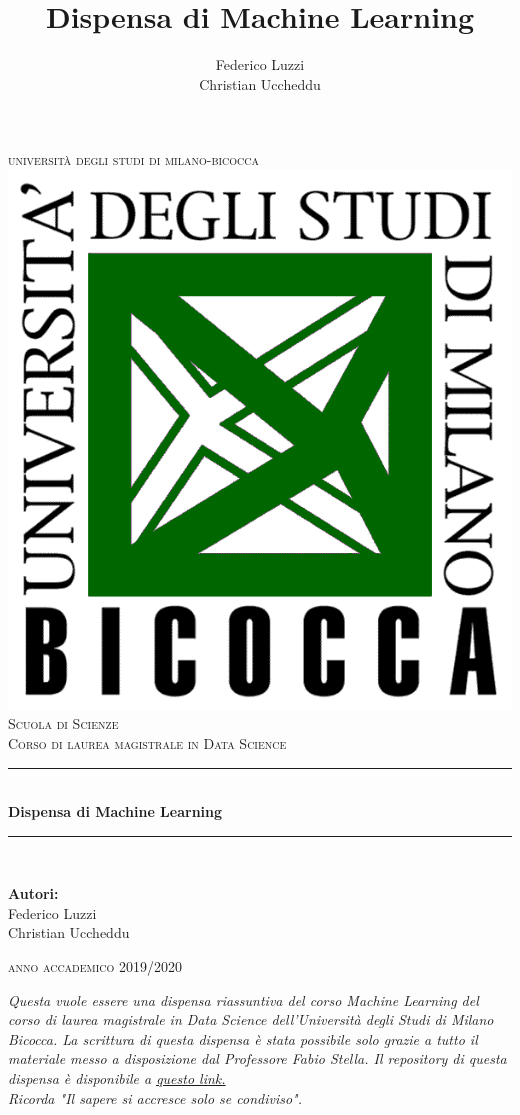 \documentclass[12pt, a4paper,titlepage,openany]{article}
\title{Dispensa di Machine Learning}
\author{Federico Luzzi \\ Christian Uccheddu}
\date{}
\theoremstyle{plain}
\theoremstyle{definition}
\theoremstyle{remark}
\begin{document}
		\begin{titlepage}
		
		\newcommand{\HRule}{\rule{\linewidth}{0.5mm}} 
		
		\centering 
		

		{ 
			\textsc{\LARGE università degli studi di milano-bicocca}\\[0.5cm] 
		}
		\includegraphics[width = .3\textwidth]{Logo-Scuola.png}\\[1cm] 
		\textsc{\Large Scuola di Scienze }\\[0.25cm] 
		\textsc{\large Corso di laurea magistrale in Data Science}\\[0.75cm] 

		
		\HRule \\[0.4cm]
		{ 
			{\huge \bfseries Dispensa di Machine Learning }\\[0.4cm] %
		}
		\HRule \\[1.5cm]
		

		\begin{center}
			\large\textbf{Autori:} \\ Federico Luzzi \\ Christian Uccheddu
		\end{center}
		\vspace{3.5cm}
		{
			{\large \textsc{anno accademico 2019/2020}}\\[1cm] 
		}
		
		\vfill 
	\end{titlepage}
	\newpage
	\textit{Questa vuole essere una dispensa riassuntiva del corso Machine Learning del corso di laurea magistrale in Data Science dell'Università degli Studi di Milano Bicocca. La scrittura di questa dispensa è stata possibile solo grazie a tutto il materiale messo a disposizione dal Professore Fabio Stella.
	Il repository di questa dispensa è disponibile a \href{https://github.com/Chri1629/machine_learning_book.git}{questo link.}
	\\ Ricorda "Il sapere si accresce solo se condiviso".}

	
	
	
	\newpage
{}
\tableofcontents
\clearpage
{}

\clearpage

\clearpage

\clearpage

\end{document}
